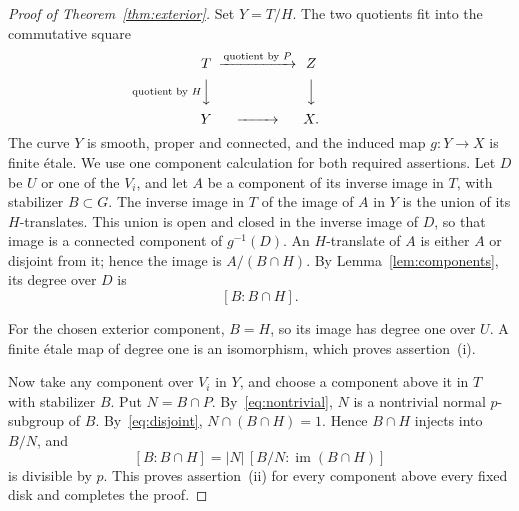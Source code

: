 \begin{proof}[Proof of Theorem~\ref{thm:exterior}]
Set $Y=T/H$. The two quotients fit into the commutative square
\[
\begin{CD}
 T @>{\text{quotient by }P}>> Z\\
 @V{\text{quotient by }H}VV @VVV\\
 Y @>>> X .
\end{CD}
\]
The curve $Y$ is smooth, proper and connected, and the induced map
$g:Y\to X$ is finite \'etale. We use one component calculation for
both required assertions. Let $D$ be $U$ or one of the $V_i$, and
let $A$ be a component of its inverse image in $T$, with stabilizer
$B\subset G$. The inverse image in $T$ of the image of $A$ in $Y$
is the union of its $H$-translates. This union is open and closed
in the inverse image of $D$, so that image is a connected component
of $g^{-1}(D)$. An
$H$-translate of $A$ is either $A$ or disjoint from it; hence the
image is $A/(B\cap H)$. By Lemma~\ref{lem:components}, its degree
over $D$ is
\[
                         [B:B\cap H].
\]

For the chosen exterior component, $B=H$, so its image has degree
one over $U$. A finite \'etale map of degree one is an isomorphism,
which proves assertion~\textup{(i)}.

Now take any component over $V_i$ in $Y$, and choose a component
above it in $T$ with stabilizer $B$. Put $N=B\cap P$.
By~\eqref{eq:nontrivial}, $N$ is a nontrivial normal $p$-subgroup
of $B$. By~\eqref{eq:disjoint}, $N\cap(B\cap H)=1$. Hence
$B\cap H$ injects into $B/N$, and
\[
 [B:B\cap H]
   =|N|\,[B/N:\operatorname{im}(B\cap H)]
\]
is divisible by $p$. This proves assertion~\textup{(ii)} for every
component above every fixed disk and completes the proof.
\end{proof}
